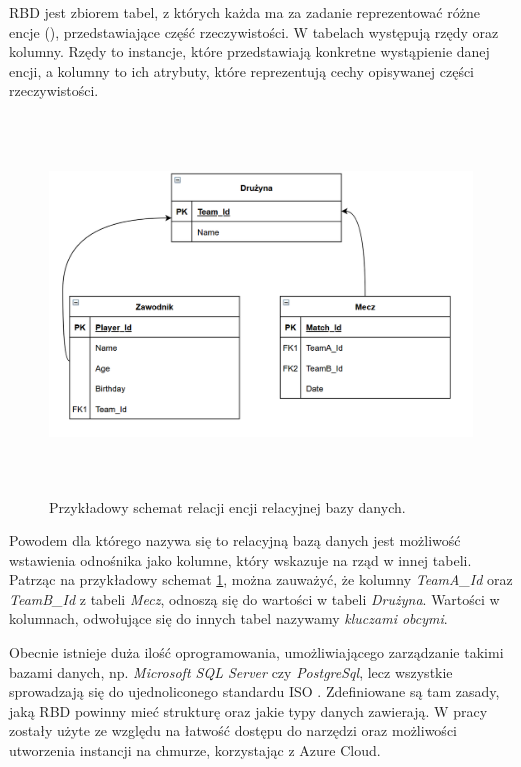 RBD jest zbiorem tabel, z których każda ma za zadanie reprezentować różne encje (), przedstawiające część rzeczywistości. W tabelach występują rzędy oraz kolumny. Rzędy to instancje, które przedstawiają konkretne wystąpienie danej encji, a kolumny to ich atrybuty, które reprezentują cechy opisywanej części rzeczywistości. 

\begin{figure}[h] 
        \centering\includegraphics[width=14cm,height=10cm]{figures/Example_entities.PNG}
        \caption{Przykładowy schemat relacji encji relacyjnej bazy danych.}\label{example-Entity}
\end{figure}

Powodem dla którego nazywa się to relacyjną bazą danych jest możliwość wstawienia odnośnika jako kolumne, który wskazuje na rząd w innej tabeli. Patrząc na przykładowy schemat \ref{example-Entity}, można zauważyć, że kolumny \textit{TeamA\_Id} oraz \textit{TeamB\_Id} z tabeli \textit{Mecz}, odnoszą się do wartości w tabeli \textit{Drużyna}. Wartości w kolumnach, odwołujące się do innych tabel nazywamy \textit{kluczami obcymi}. \cite{Relational_Databases_Milan}

Obecnie istnieje duża ilość oprogramowania, umożliwiającego zarządzanie takimi bazami danych, np. \textit{Microsoft SQL Server} czy \textit{PostgreSql}, lecz wszystkie sprowadzają się do ujednoliconego standardu ISO \cite{SQL_ISO}. Zdefiniowane są tam zasady, jaką RBD powinny mieć strukturę oraz jakie typy danych zawierają. W pracy zostały użyte ze względu na łatwość dostępu do narzędzi oraz możliwości utworzenia instancji na chmurze, korzystając z Azure Cloud.

